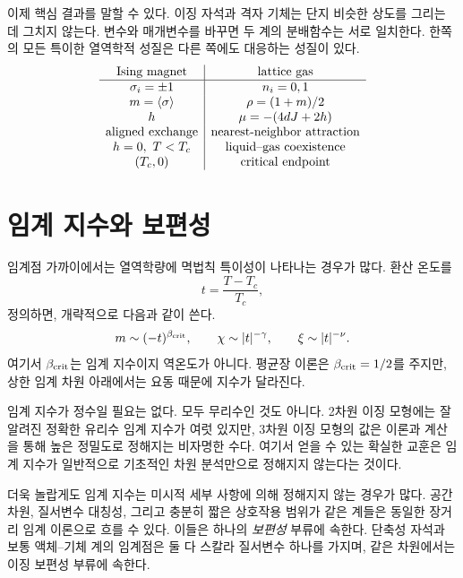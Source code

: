 이제 핵심 결과를 말할 수 있다. 이징 자석과 격자 기체는 단지 비슷한 상도를 그리는 데 그치지 않는다. 변수와 매개변수를 바꾸면 두 계의 분배함수는 서로 일치한다. 한쪽의 모든 특이한 열역학적 성질은 다른 쪽에도 대응하는 성질이 있다.
\begin{equation}
\begin{array}{c|c}
\text{Ising magnet} & \text{lattice gas}\\ \hline
\sigma_i=\pm1 & n_i=0,1\\
m=\left\langle\sigma\right\rangle & \rho=(1+m)/2\\
h & \mu=-(4dJ+2h)\\
\text{aligned exchange} & \text{nearest-neighbor attraction}\\
h=0,\ T<T_c & \text{liquid--gas coexistence}\\
(T_c,0) & \text{critical endpoint}
\end{array}
\label{eq:ising-fluid-dictionary}
\end{equation}

\section{임계 지수와 보편성}

임계점 가까이에서는 열역학량에 멱법칙 특이성이 나타나는 경우가 많다. 환산 온도를
\begin{equation}
t=\frac{T-T_c}{T_c},
\end{equation}
정의하면, 개략적으로 다음과 같이 쓴다.
\begin{equation}
m\sim(-t)^{\beta_{\rm crit}},
\qquad
\chi\sim |t|^{-\gamma},
\qquad
\xi\sim |t|^{-\nu}.
\label{eq:critical-exponents}
\end{equation}
여기서 \(\beta_{\rm crit}\)는 임계 지수이지 역온도가 아니다. 평균장 이론은 \(\beta_{\rm crit}=1/2\)를 주지만, 상한 임계 차원 아래에서는 요동 때문에 지수가 달라진다.

임계 지수가 정수일 필요는 없다. 모두 무리수인 것도 아니다. 2차원 이징 모형에는 잘 알려진 정확한 유리수 임계 지수가 여럿 있지만, 3차원 이징 모형의 값은 이론과 계산을 통해 높은 정밀도로 정해지는 비자명한 수다. 여기서 얻을 수 있는 확실한 교훈은 임계 지수가 일반적으로 기초적인 차원 분석만으로 정해지지 않는다는 것이다.

더욱 놀랍게도 임계 지수는 미시적 세부 사항에 의해 정해지지 않는 경우가 많다. 공간 차원, 질서변수 대칭성, 그리고 충분히 짧은 상호작용 범위가 같은 계들은 동일한 장거리 임계 이론으로 흐를 수 있다. 이들은 하나의 \emph{보편성} 부류에 속한다. 단축성 자석과 보통 액체--기체 계의 임계점은 둘 다 스칼라 질서변수 하나를 가지며, 같은 차원에서는 이징 보편성 부류에 속한다.

